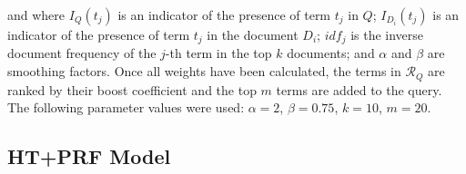 \documentclass[a4paper]{article}
\begin{document}
and where $I_Q(t_j)$ is an indicator of the presence of term $t_j$ in $Q$; $I_{D_i}(t_j)$ is an indicator of the presence of term $t_j$ in the document $D_i$; $idf_j$ is the inverse document frequency of the $j$-th term in the top $k$ documents; and $\alpha$ and $\beta$ are smoothing factors. Once all weights have been calculated, the terms in $\mathcal{R}_Q$ are ranked by their boost coefficient and the top $m$ terms are added to the query. The following parameter values were used: $\alpha = 2$, $\beta = 0.75$, $k = 10$, $m = 20$.

\subsection{HT+PRF Model}




\end{document}
